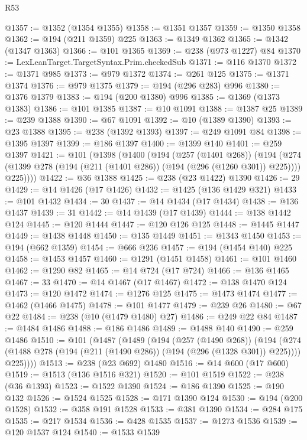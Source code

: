 \begin{lexlean}{R53}
\begin{coremodule}
@1357 := @1352 (@1354 @1355)
@1358 := @1351 @1357
@1359 := @1350 @1358
@1362 := @194 (@211 @1359) @225
@1363 := @1349 @1362
@1365 := @1342 (@1347 @1363)
@1366 := @101 @1365
@1369 := @238 (@973 @1227) @84
@1370 := LexLeanTarget.TargetSyntax.Prim.checkedSub
@1371 := @116 @1370
@1372 := @1371 @985
@1373 := @979 @1372
@1374 := @261 @125
@1375 := @1371 @1374
@1376 := @979 @1375
@1379 := @194 (@296 @283) @996
@1380 := @1376 @1379
@1383 := @194 (@200 @1380) @996
@1385 := @1369 (@1373 @1383)
@1386 := @101 @1385
@1387 := @10 @1091
@1388 := @1387 @25
@1389 := @239 @1388
@1390 := @67 @1091
@1392 := @10 (@1389 @1390)
@1393 := @23 @1388
@1395 := @238 (@1392 @1393)
@1397 := @249 @1091 @84
@1398 := @1395 @1397
@1399 := @186 @1397
@1400 := @1399 @140
@1401 := @259 @1397
@1421 := @101
    (@1398
      (@1400
        (@194
          (@257 (@1401 @268))
          (@194
            (@274 (@1399 @278 (@194 (@211 (@1401 @286)) (@194 (@296 (@1260 @301)) @225))))
            @225))))
@1422 := @36 @1388
@1425 := @238 (@23 @1422) @1390
@1426 := 29
@1429 := @14 @1426 (@17 @1426)
@1432 := @1425 (@136 @1429 @321)
@1433 := @101 @1432
@1434 := 30
@1437 := @14 @1434 (@17 @1434)
@1438 := @136 @1437
@1439 := 31
@1442 := @14 @1439 (@17 @1439)
@1444 := @138 @1442 @124
@1445 := @120 @1444
@1447 := @120 @126 @125
@1448 := @1445 @1447
@1449 := @1438 @1448
@1450 := @135 @1449
@1451 := @1343 @1450
@1453 := @194 (@662 @1359)
@1454 := @666 @236
@1457 := @194 (@1454 @140) @225
@1458 := @1453 @1457
@1460 := @1291 (@1451 @1458)
@1461 := @101 @1460
@1462 := @1290 @82
@1465 := @14 @724 (@17 @724)
@1466 := @136 @1465
@1467 := 33
@1470 := @14 @1467 (@17 @1467)
@1472 := @138 @1470 @124
@1473 := @120 @1472
@1474 := @1276 @125
@1475 := @1473 @1474
@1477 := @1462 (@1466 @1475)
@1478 := @101 @1477
@1479 := @239 @26
@1480 := @67 @22
@1484 := @238 (@10 (@1479 @1480) @27)
@1486 := @249 @22 @84
@1487 := @1484 @1486
@1488 := @186 @1486
@1489 := @1488 @140
@1490 := @259 @1486
@1510 := @101
    (@1487
      (@1489
        (@194
          (@257 (@1490 @268))
          (@194
            (@274 (@1488 @278 (@194 (@211 (@1490 @286)) (@194 (@296 (@1328 @301)) @225))))
            @225))))
@1513 := @238 (@23 @692) @1480
@1516 := @14 @600 (@17 @600)
@1519 := @1513 (@136 @1516 @321)
@1520 := @101 @1519
@1522 := @238 (@36 @1393)
@1523 := @1522 @1390
@1524 := @186 @1390
@1525 := @190 @132
@1526 := @1524 @1525
@1528 := @171 @1390 @124
@1530 := @194 (@200 @1528)
@1532 := @358 @191 @1528
@1533 := @381 @1390
@1534 := @284 @175
@1535 := @217 @1534
@1536 := @428 @1535
@1537 := @1273 @1536
@1539 := @120 @1537 @124
@1540 := @1533 @1539

\end{coremodule}
\end{lexlean}
